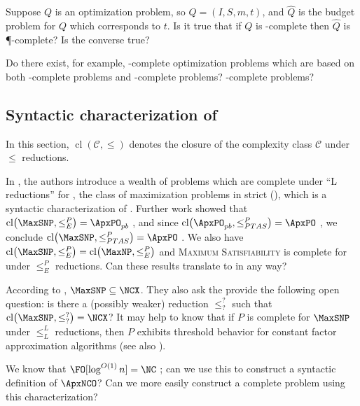 \documentclass[]{article}
\newcommand{\cl}{\operatorname{cl}}
\let\originalleft\left
\let\originalright\right
\renewcommand{\left}{\mathopen{}\mathclose\bgroup\originalleft}
\renewcommand{\right}{\aftergroup\egroup\originalright}
\begin{document}
\begin{todo}
  Suppose $Q$ is an optimization problem, so $Q=(I, S, m, t)$, and $\hat{Q}$ is the budget problem for $Q$ which corresponds to $t$.
  Is it true that if $Q$ is \PO-complete then $\hat{Q}$ is \P-complete?
  Is the converse true?
\end{todo}

\begin{todo}
  Do there exist, for example, \ApxPO-complete optimization problems which are based on both \NP-complete problems and \PSPACE-complete problems?
  \STP-complete problems?
\end{todo}

\subsection{Syntactic characterization of \texorpdfstring{\ApxNCO}{ApxNCO}}

In this section, $\cl(\mathcal{C}, \leq)$ denotes the closure of the complexity class $\mathcal{C}$ under $\leq$ reductions.

In \cite{py91}, the authors introduce a wealth of problems which are complete under ``L reductions'' for \MaxSNP, the class of maximization problems in strict \NP{} (\SNP), which is a syntactic characterization of \NP.
Further work showed that $\cl\left(\MaxSNP, \leq^P_E\right) = \ApxPO_{pb}$ \cite[Theorem~1]{kmsv99}, and since $\cl\left(\ApxPO_{pb}, \leq^P_{PTAS}\right) = \ApxPO$ \cite{ct00}, we conclude $\cl\left(\MaxSNP, \leq^P_{PTAS}\right) = \ApxPO$ \cite{kmsv99}.
We also have $\cl\left(\MaxSNP, \leq^P_E\right) = \cl\left(\MaxNP, \leq^P_E\right)$ \cite[Theorem~2]{kmsv99} and \textsc{Maximum Satisfiability} is complete for \MaxNP{} under $\leq^P_E$ reductions.
Can these results translate to \NC{} in any way?

According to \cite[Theorem~9.1.3]{dsst97}, $\MaxSNP \subseteq \NCX$.
They also ask the provide the following open question: is there a (possibly weaker) reduction $\leq^?_?$ such that $\cl\left(\MaxSNP, \leq^?_?\right) = \NCX$?
It may help to know that if $P$ is complete for $\MaxSNP$ under $\leq^L_L$ reductions, then $P$ exhibits threshold behavior for constant factor \NC{} approximation algorithms \cite[Theorem~9]{sx95} (see also \cite[Theorem~9.2.3]{dsst97}).

\begin{todo}
  We know that $\FO[\log^{O(1)} n] = \NC$ \cite[Theorem~5.2]{immerman99}; can we use this to construct a syntactic definition of $\ApxNCO$?
  Can we more easily construct a complete problem using this characterization?
\end{todo}
\end{document}
